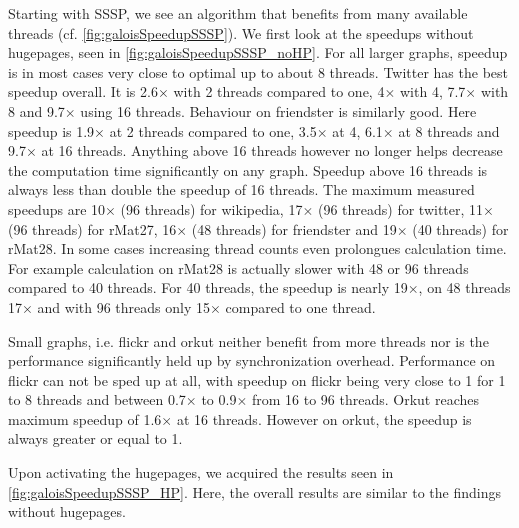 Starting with SSSP, we see an algorithm that benefits from many available threads (cf. \autoref{fig:galoisSpeedupSSSP}).
We first look at the speedups without hugepages, seen in \autoref{fig:galoisSpeedupSSSP_noHP}.
For all larger graphs, speedup is in most cases very close to optimal up to about 8 threads.
Twitter has the best speedup overall. It is 2.6$\times$ with 2 threads compared to one, 4$\times$ with 4, 7.7$\times$ with 8 and 9.7$\times$ using 16 threads.
Behaviour on friendster is similarly good. Here speedup is 1.9$\times$ at 2 threads compared to one, 3.5$\times$ at 4, 6.1$\times$ at 8 threads and 9.7$\times$ at 16 threads.
Anything above 16 threads however no longer helps decrease the computation time significantly on any graph. Speedup above 16 threads is always less than double the speedup of 16 threads. The maximum measured speedups are 10$\times$ (96 threads) for wikipedia, 17$\times$ (96 threads) for twitter, 11$\times$ (96 threads) for rMat27, 16$\times$ (48 threads) for friendster and 19$\times$ (40 threads) for rMat28.
In some cases increasing thread counts even prolongues calculation time. For example calculation on rMat28 is actually slower with 48 or 96 threads compared to 40 threads. For 40 threads, the speedup is nearly 19$\times$, on 48 threads 17$\times$ and with 96 threads only 15$\times$ compared to one thread.

Small graphs, i.e. flickr and orkut neither benefit from more threads nor is the performance significantly held up by synchronization overhead.
Performance on flickr can not be sped up at all, with speedup on flickr being very close to 1 for 1 to 8 threads and between 0.7$\times$ to 0.9$\times$ from 16 to 96 threads.
Orkut reaches maximum speedup of 1.6$\times$ at 16 threads. However on orkut, the speedup is always greater or equal to 1.

Upon activating the hugepages, we acquired the results seen in \autoref{fig:galoisSpeedupSSSP_HP}. Here, the overall results are similar to the findings without hugepages. 




